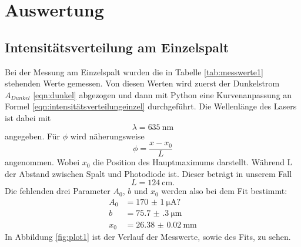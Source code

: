 \documentclass[
  bibliography=totoc,     %
  captions=tableheading,  %
  titlepage=firstiscover, %
]{scrartcl}
\begin{document}
\section{Auswertung}
\label{sec:auswertung}
\subsection{Intensitätsverteilung am Einzelspalt}
Bei der Messung am Einzelspalt wurden die in Tabelle \ref{tab:messwerte1}
stehenden Werte gemessen. Von diesen Werten wird zuerst der Dunkelstrom
$A_{Dunkel}$ \eqref{eqn:dunkel} abgezogen und dann mit Python eine
Kurvenanpassung an Formel \eqref{eqn:intensitätsverteilungeinzel}
durchgeführt. Die Wellenlänge des Lasers ist dabei mit
\begin{equation}
  \lambda = \SI{635}{\nano\meter}
\end{equation}
angegeben. Für $\phi$ wird näherungsweise
\begin{equation}
  \phi = \frac{x-x_0}{L}
\end{equation}
angenommen. Wobei $x_0$ die Position des Hauptmaximums darstellt. Während L
der Abstand zwischen Spalt und Photodiode ist. Dieser beträgt in unserem Fall
\begin{equation}
  L = \SI{124}{\centi\meter}.
\end{equation}
Die fehlenden drei Parameter $A_0$, $b$ und $x_0$ werden also bei dem Fit
bestimmt:
\begin{align}
  A_0 &= \SI{170(1)}{\micro\ampere}?\\
  b &= \SI{75.7(3)}{\micro\meter}\\
  x_0 &= \SI{26.38(2)}{\milli\meter}
\end{align}
In Abbildung \ref{fig:plot1} ist der Verlauf der Messwerte, sowie des Fits,
zu sehen.
\end{document}
